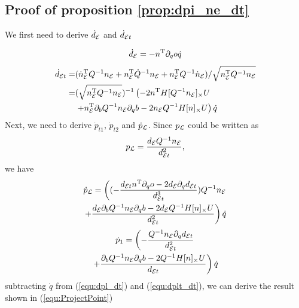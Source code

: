 \documentclass[journal]{IEEEtran}  %
\begin{document}
  \subsection{Proof of proposition \ref{prop:dpi_ne_dt}}\label{proof:dpi_ne_dt}
    We first need to derive $\dot{d}_{\mathcal{E}}$ and $\dot{d}_{\mathcal{E} t}$

    \begin{equation}
      \dot d_{\mathcal{E}} = -n^\mathrm{T} \partial_q o \dot q
    \end{equation}
    \begin{equation}\label{equ:dot det}
      \begin{split}
        \dot d_{\mathcal{E} t} =&  (\dot n_{\mathcal{E}}^\mathrm{T} Q^{-1} n_{\mathcal{E}} + n_{\mathcal{E}}^\mathrm{T} \dot Q^{-1} n_{\mathcal{E}} + n_{\mathcal{E}}^\mathrm{T} Q^{-1} \dot n_{\mathcal{E}}) /\sqrt{n_{\mathcal{E}}^\mathrm{T} Q^{-1} n_{\mathcal{E}}}\\
        = & (\sqrt{n_{\mathcal{E}}^\mathrm{T} Q^{-1} n_{\mathcal{E}}})^{-1}\left(-2n^\mathrm{T} H[Q^{-1}n_{\mathcal{E}}]_\times U \right.\\
        &\left. + n_{\mathcal{E}} ^\mathrm{T} \partial_b Q^{-1} n_{\mathcal{E}} \partial_q b  -2 n_{\mathcal{E}} Q^{-1}H[n]_\times U \right) \dot q
      \end{split}
    \end{equation}
    Next, we need to derive  $\dot p_{t1}$, $\dot p_{t2} $ and $\dot p_{\mathcal{L}}$. Since $p_{\mathcal{L}}$ could be written as
    \begin{equation}
      p_{\mathcal{L}} = \frac{d_{\mathcal{E}} Q^{-1} n_{\mathcal{E}}}{ d_{\mathcal{E} t} ^2},
    \end{equation}
    we have
    \begin{multline}\label{equ:dpl_dt}
        \dot p_{\mathcal{L}} =  \left( (-\frac{d_{\mathcal{E} t} n^\mathrm{T} \partial_q o -2d_{\mathcal{E}} \partial_q d_{\mathcal{E} t}}{d_{\mathcal{E} t}^3} )Q^{-1}n_{\mathcal{E}} \right.\\
        \left .+ \frac{d_{\mathcal{E}}\partial_b Q^{-1} n_{\mathcal{E}} \partial_q b -  2d_{\mathcal{E}} Q^{-1}H[n]_\times U}{d_{\mathcal{E} t}^2}\right) \dot q
    \end{multline}
    \begin{multline}\label{equ:dplt_dt}
        \dot p_{1} =  \left(-\frac{Q^{-1}n_{\mathcal{E}} \partial_q d_{\mathcal{E} t} }{d_{\mathcal{E} t}^2} \right.\\
         \left. + \frac{\partial_b Q^{-1}n_{\mathcal{E}} \partial_q b -  2Q^{-1}H[n]_\times U }{d_{\mathcal{E} t}} \right) \dot q
    \end{multline}
    subtracting $\dot q$ from (\ref{equ:dpl_dt}) and (\ref{equ:dplt_dt}), we can derive the result shown in (\ref{equ:ProjectPoint})


{\small


}
\end{document}
